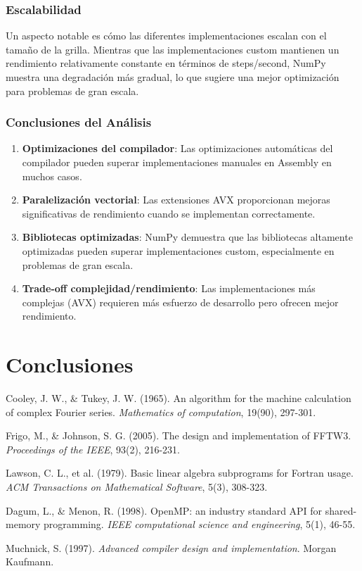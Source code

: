 \documentclass[a4paper]{article}
\begin{document}
\subsubsection{Escalabilidad}

Un aspecto notable es cómo las diferentes implementaciones escalan con el tamaño de la grilla. Mientras que las implementaciones custom mantienen un rendimiento relativamente constante en términos de steps/second, NumPy muestra una degradación más gradual, lo que sugiere una mejor optimización para problemas de gran escala.

\subsubsection{Conclusiones del Análisis}

\begin{enumerate}
    \item \textbf{Optimizaciones del compilador}: Las optimizaciones automáticas del compilador pueden superar implementaciones manuales en Assembly en muchos casos.
    \item \textbf{Paralelización vectorial}: Las extensiones AVX proporcionan mejoras significativas de rendimiento cuando se implementan correctamente.
    \item \textbf{Bibliotecas optimizadas}: NumPy demuestra que las bibliotecas altamente optimizadas pueden superar implementaciones custom, especialmente en problemas de gran escala.
    \item \textbf{Trade-off complejidad/rendimiento}: Las implementaciones más complejas (AVX) requieren más esfuerzo de desarrollo pero ofrecen mejor rendimiento.
\end{enumerate}

\section{Conclusiones}


\begin{thebibliography}{9}
    Cooley, J. W., \& Tukey, J. W. (1965). An algorithm for the machine calculation of complex Fourier series. \textit{Mathematics of computation}, 19(90), 297-301.

    Frigo, M., \& Johnson, S. G. (2005). The design and implementation of FFTW3. \textit{Proceedings of the IEEE}, 93(2), 216-231.

    Lawson, C. L., et al. (1979). Basic linear algebra subprograms for Fortran usage. \textit{ACM Transactions on Mathematical Software}, 5(3), 308-323.

    Dagum, L., \& Menon, R. (1998). OpenMP: an industry standard API for shared-memory programming. \textit{IEEE computational science and engineering}, 5(1), 46-55.

    Muchnick, S. (1997). \textit{Advanced compiler design and implementation}. Morgan Kaufmann.
\end{thebibliography}
\end{document}
